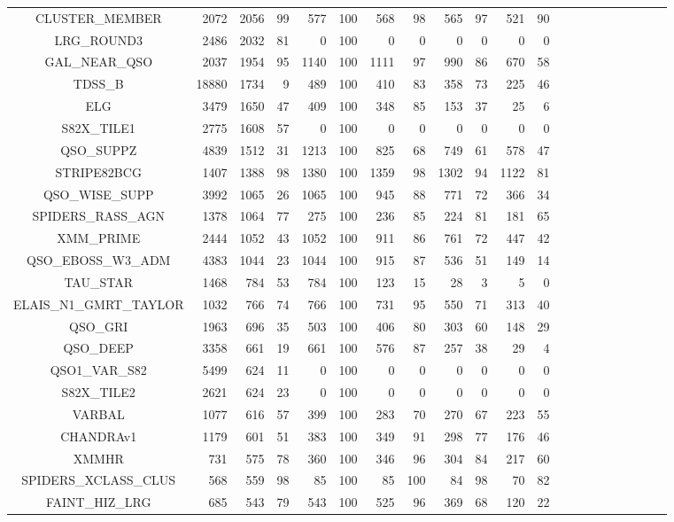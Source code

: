 \documentclass[onecolumn]{aa}
\begin{document}
\begin{center}
\begin{longtable}{c rrr rrr rrrrrrrrrrrrrr}
CLUSTER\_MEMBER & 2072 & 2056 & 99 & 577 & 100 & 568 & 98 & 565 & 97 & 521 & 90 \\ 
LRG\_ROUND3 & 2486 & 2032 & 81 & 0 & 100 & 0 & 0 & 0 & 0 & 0 & 0 \\ 
GAL\_NEAR\_QSO & 2037 & 1954 & 95 & 1140 & 100 & 1111 & 97 & 990 & 86 & 670 & 58 \\ 
TDSS\_B & 18880 & 1734 & 9 & 489 & 100 & 410 & 83 & 358 & 73 & 225 & 46 \\ 
ELG & 3479 & 1650 & 47 & 409 & 100 & 348 & 85 & 153 & 37 & 25 & 6 \\ 
S82X\_TILE1 & 2775 & 1608 & 57 & 0 & 100 & 0 & 0 & 0 & 0 & 0 & 0 \\ 
QSO\_SUPPZ & 4839 & 1512 & 31 & 1213 & 100 & 825 & 68 & 749 & 61 & 578 & 47 \\ 
STRIPE82BCG & 1407 & 1388 & 98 & 1380 & 100 & 1359 & 98 & 1302 & 94 & 1122 & 81 \\ 
QSO\_WISE\_SUPP & 3992 & 1065 & 26 & 1065 & 100 & 945 & 88 & 771 & 72 & 366 & 34 \\ 
SPIDERS\_RASS\_AGN & 1378 & 1064 & 77 & 275 & 100 & 236 & 85 & 224 & 81 & 181 & 65 \\ 
XMM\_PRIME & 2444 & 1052 & 43 & 1052 & 100 & 911 & 86 & 761 & 72 & 447 & 42 \\ 
QSO\_EBOSS\_W3\_ADM & 4383 & 1044 & 23 & 1044 & 100 & 915 & 87 & 536 & 51 & 149 & 14 \\ 
TAU\_STAR & 1468 & 784 & 53 & 784 & 100 & 123 & 15 & 28 & 3 & 5 & 0 \\ 
ELAIS\_N1\_GMRT\_TAYLOR & 1032 & 766 & 74 & 766 & 100 & 731 & 95 & 550 & 71 & 313 & 40 \\ 
QSO\_GRI & 1963 & 696 & 35 & 503 & 100 & 406 & 80 & 303 & 60 & 148 & 29 \\ 
QSO\_DEEP & 3358 & 661 & 19 & 661 & 100 & 576 & 87 & 257 & 38 & 29 & 4 \\ 
QSO1\_VAR\_S82 & 5499 & 624 & 11 & 0 & 100 & 0 & 0 & 0 & 0 & 0 & 0 \\ 
S82X\_TILE2 & 2621 & 624 & 23 & 0 & 100 & 0 & 0 & 0 & 0 & 0 & 0 \\ 
VARBAL & 1077 & 616 & 57 & 399 & 100 & 283 & 70 & 270 & 67 & 223 & 55 \\ 
CHANDRAv1 & 1179 & 601 & 51 & 383 & 100 & 349 & 91 & 298 & 77 & 176 & 46 \\ 
XMMHR & 731 & 575 & 78 & 360 & 100 & 346 & 96 & 304 & 84 & 217 & 60 \\ 
SPIDERS\_XCLASS\_CLUS & 568 & 559 & 98 & 85 & 100 & 85 & 100 & 84 & 98 & 70 & 82 \\ 
FAINT\_HIZ\_LRG & 685 & 543 & 79 & 543 & 100 & 525 & 96 & 369 & 68 & 120 & 22 \\ 

\end{longtable}
\end{center}
\end{document}
